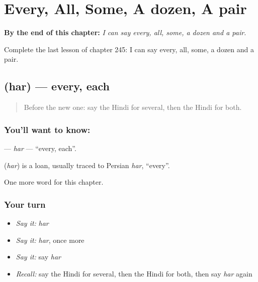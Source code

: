 
\chapter{Every, All, Some, A dozen, A pair}
\label{ch:hi-every-all-some-a-dozen-a-pair}

\begin{chapteropening}
\textbf{By the end of this chapter:} \emph{I can say every, all, some, a dozen and a pair.}

Complete the last lesson of chapter 245: I can say every, all, some, a dozen and a pair.
\end{chapteropening}

\section[\texorpdfstring{\hi{हर} (har)}{हर (har)}]{ (har) — every, each}

\label{lesson:HI-C245-har}



\begin{quote}
Before the new one: say the Hindi for several, then the Hindi for both.
\end{quote}

\subsection*{You'll want to know: }
\textbf{} — \emph{har} — \textquotedblleft{}every, each\textquotedblright{}.

\begin{cousinweb}
\textbf{} (\emph{har}) is a loan, usually traced to Persian \emph{har}, \textquotedblleft{}every\textquotedblright{}.
\end{cousinweb}

\begin{grammarlens}[title={What you've built}]
One more word for this chapter.
\end{grammarlens}

\subsection*{Your turn}
\begin{itemize}
\raggedright
  \item \emph{Say it:} \emph{har}
  \item \emph{Say it:} \emph{har}, once more
  \item \emph{Say it:} say \emph{har}
  \item \emph{Recall:} say the Hindi for several, then the Hindi for both, then say \emph{har} again
\end{itemize}

